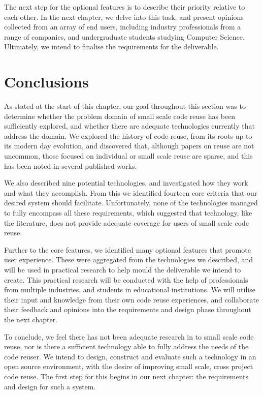 The next step for the optional features is to describe their priority relative to each other. In the next chapter, we delve into this task, and present opinions collected from an array of end users, including industry professionals from a range of companies, and undergraduate students studying Computer Science. Ultimately, we intend to finalise the requirements for the deliverable.

\section{Conclusions}
As stated at the start of this chapter, our goal throughout this section was to determine whether the problem domain of small scale code reuse has been sufficiently explored, and whether there are adequate technologies currently that address the domain. We explored the history of code reuse, from its roots up to its modern day evolution, and discovered that, although papers on reuse are not uncommon, those focused on individual or small scale reuse are sparse, and this has been noted in several published works.

We also described nine potential technologies, and investigated how they work and what they accomplish. From this we identified fourteen core criteria that our desired system should facilitate. Unfortunately, none of the technologies managed to fully encompass all these requirements, which suggested that technology, like the literature, does not provide adequate coverage for users of small scale code reuse. 

Further to the core features, we identified many optional features that promote user experience. These were aggregated from the technologies we described, and will be used in practical research to help mould the deliverable we intend to create. This practical research will be conducted with the help of professionals from multiple industries, and students in educational institutions. We will utilise their input and knowledge from their own code reuse experiences, and collaborate their feedback and opinions into the requirements and design phase throughout the next chapter.

To conclude, we feel there has not been adequate research in to small scale code reuse, nor is there a sufficient technology able to fully address the needs of the code reuser. We intend to design, construct and evaluate such a technology in an open source environment, with the desire of improving small scale, cross project code reuse. The first step for this begins in our next chapter: the requirements and design for such a system.


